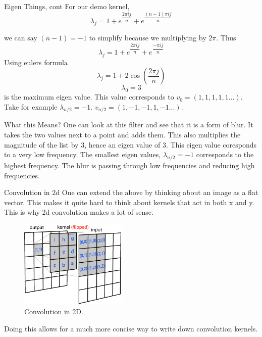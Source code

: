 \documentclass{beamer}
\begin{document}
\begin{frame}{Eigen Things, cont}
For our demo kernel,
$$\lambda_j = 1+e^{\dfrac{2\pi i j}{n}}+e^{\dfrac{(n-1)\pi i j}{n}}$$

we can say $(n-1) = -1$ to simplify because we multiplying by $2\pi$. Thus   
$$\lambda_j = 1+e^{\dfrac{2\pi i j}{n}}+e^{\dfrac{-\pi i j}{n}}$$
Using eulers formula
$$\lambda_j = 1+2\cos(\dfrac{2\pi j}{n})$$
$$\lambda_{0} = 3$$ is the maximum eigen value.
This value corresponds to $v_0 = (1,1,1,1,1...)$.
Take for example $\lambda_{n/2} = -1$.  $v_{n/2} = (1,-1,-1,1,-1...)$.

\end{frame}

\begin{frame}{What this Means?}
One can look at this filter and see that it is a form of blur. It takes the two values next to a point and adds them.  This also multiplies the magnitude of the list by 3, hence an eigen value of 3. This eigen value coresponds to a very low frequency. The smallest eigen values, $\lambda_{n/2} = -1$ corresponds to the highest frequency. The blur is passing through low frequencies and reducing high frequencies.
\end{frame}

\begin{frame}{Convolution in 2d}
One can extend the above by thinking about an image as a flat vector. This makes it quite hard to think about kernels that act in both x and y. This is why 2d convolution makes a lot of sense.
\begin{figure}[htp]
\centering
\includegraphics[width=2in]{conv2d_matrix.jpg}
\caption{Convolution in 2D.}
\label{}
\end{figure}
Doing this allows for a much more concise way to write down convolution kernels.
\end{frame}
\end{document}
